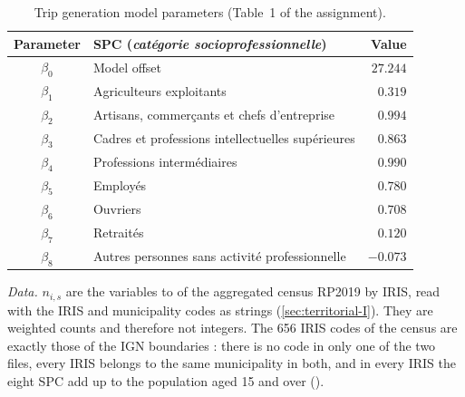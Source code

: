 \begin{table}[H]
  \centering
  \caption{Trip generation model parameters (Table~1 of the assignment).}
  \label{tab:trip-generation-parameters}
  \begin{tabular}{@{}clr@{}}
    \toprule
    Parameter & SPC (\emph{cat\'egorie socioprofessionnelle}) & Value \\
    \midrule
    $\beta_0$ & Model offset & $27.244$ \\
    $\beta_1$ & Agriculteurs exploitants & $0.319$ \\
    $\beta_2$ & Artisans, commer\c{c}ants et chefs d'entreprise & $0.994$ \\
    $\beta_3$ & Cadres et professions intellectuelles sup\'erieures & $0.863$ \\
    $\beta_4$ & Professions interm\'ediaires & $0.990$ \\
    $\beta_5$ & Employ\'es & $0.780$ \\
    $\beta_6$ & Ouvriers & $0.708$ \\
    $\beta_7$ & Retrait\'es & $0.120$ \\
    $\beta_8$ & Autres personnes sans activit\'e professionnelle & $-0.073$ \\
    \bottomrule
  \end{tabular}
\end{table}

\emph{Data.} $n_{i,s}$ are the variables  to  of the aggregated census
RP2019 by IRIS, read with the IRIS and municipality codes as strings (\cref{sec:territorial-I}). They are weighted
counts and therefore not integers. The 656 IRIS codes of the census are exactly those of the IGN boundaries
\cite{ign-contours-iris}: there is no code in only one of the two files, every IRIS belongs to the same municipality in
both, and in every IRIS the eight SPC add up to the population aged 15 and over ().


